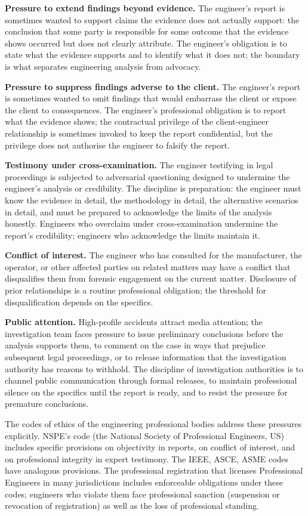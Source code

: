 \textbf{Pressure to extend findings beyond evidence.} The engineer's report is sometimes wanted to support claims the evidence does not actually support: the conclusion that some party is responsible for some outcome that the evidence shows occurred but does not clearly attribute. The engineer's obligation is to state what the evidence supports and to identify what it does not; the boundary is what separates engineering analysis from advocacy.

\textbf{Pressure to suppress findings adverse to the client.} The engineer's report is sometimes wanted to omit findings that would embarrass the client or expose the client to consequences. The engineer's professional obligation is to report what the evidence shows; the contractual privilege of the client-engineer relationship is sometimes invoked to keep the report confidential, but the privilege does not authorise the engineer to falsify the report.

\textbf{Testimony under cross-examination.} The engineer testifying in legal proceedings is subjected to adversarial questioning designed to undermine the engineer's analysis or credibility. The discipline is preparation: the engineer must know the evidence in detail, the methodology in detail, the alternative scenarios in detail, and must be prepared to acknowledge the limits of the analysis honestly. Engineers who overclaim under cross-examination undermine the report's credibility; engineers who acknowledge the limits maintain it.

\textbf{Conflict of interest.} The engineer who has consulted for the manufacturer, the operator, or other affected parties on related matters may have a conflict that disqualifies them from forensic engagement on the current matter. Disclosure of prior relationships is a routine professional obligation; the threshold for disqualification depends on the specifics.

\textbf{Public attention.} High-profile accidents attract media attention; the investigation team faces pressure to issue preliminary conclusions before the analysis supports them, to comment on the case in ways that prejudice subsequent legal proceedings, or to release information that the investigation authority has reasons to withhold. The discipline of investigation authorities is to channel public communication through formal releases, to maintain professional silence on the specifics until the report is ready, and to resist the pressure for premature conclusions.

The codes of ethics of the engineering professional bodies address these pressures explicitly. NSPE's code (the National Society of Professional Engineers, US) includes specific provisions on objectivity in reports, on conflict of interest, and on professional integrity in expert testimony. The IEEE, ASCE, ASME codes have analogous provisions. The professional registration that licenses Professional Engineers in many jurisdictions includes enforceable obligations under these codes; engineers who violate them face professional sanction (suspension or revocation of registration) as well as the loss of professional standing.

